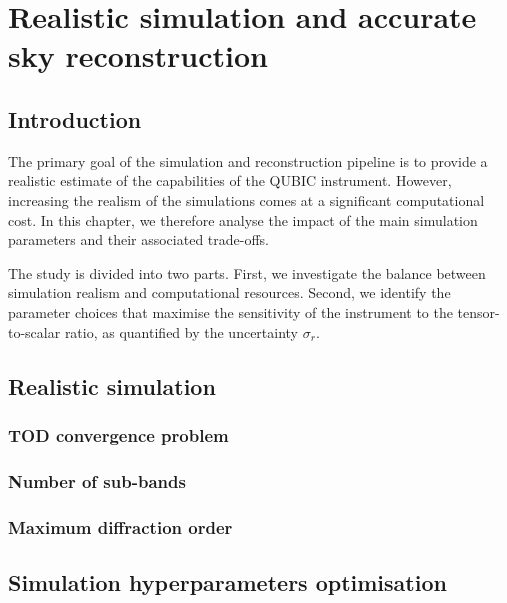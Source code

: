 \documentclass[../../thesis.tex]{subfiles}
\begin{document}
\chapter{Realistic simulation and accurate sky reconstruction} \label{chap:tod}

\ifSubfilesClassLoaded{
    \tableofcontents
}{
    \minitoc
}

\section*{Introduction}

The primary goal of the simulation and reconstruction pipeline is to provide a realistic estimate of the capabilities of the QUBIC instrument. However, increasing the realism of the simulations comes at a significant computational cost. In this chapter, we therefore analyse the impact of the main simulation parameters and their associated trade-offs.

The study is divided into two parts. First, we investigate the balance between simulation realism and computational resources. Second, we identify the parameter choices that maximise the sensitivity of the instrument to the tensor-to-scalar ratio, as quantified by the uncertainty $\sigma_r$.

\section{Realistic simulation}

\subsection{TOD convergence problem}

\subsection{Number of sub-bands} \label{sub:nsub}


\subsection{Maximum diffraction order}

\section{Simulation hyperparameters optimisation}
\end{document}
